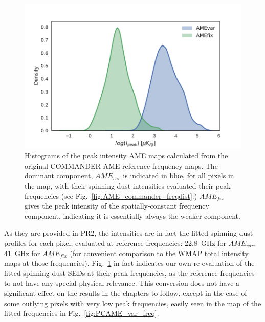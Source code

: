               \begin{figure}
                 \includegraphics[width=\textwidth]{../Plots/ch_datasources/AME_comps_distplot.pdf}
                 \centering
                 \caption{Histograms of the peak intensity AME maps calculated from the original COMMANDER-AME reference frequency maps. The dominant component, $AME_{var}$ is indicated in blue, for all pixels in the map, with their spinning dust intensities evaluated their peak frequencies (see Fig.~\ref{fig:AME_commander_freqdist}.) $AME_{fix}$ gives the peak intensity of the spatially-constant frequency component, indicating it is essentially always the weaker component.}
                 \label{fig:AME_comps_distplot}
              \end{figure}
           As they are provided in PR2, the intensities are in fact the fitted spinning dust profiles for each pixel, evaluated at reference frequencies: 22.8~GHz for $AME_{var}$, 41~GHz for $AME_{fix}$ (for convenient comparison to the WMAP total intensity maps at those frequencies). Fig.~\ref{fig:AME_comps_distplot} in fact indicates our own re-evaluation of the fitted spinning dust SEDs at their peak frequencies, as the reference frequencies to not have any special physical relevance. This conversion does not have a significant effect on the results in the chapters to follow, except in the case of some outlying pixels with very low peak frequencies, easily seen in the map of the fitted frequencies in Fig.~\ref{fig:PCAME_var_freq}.
